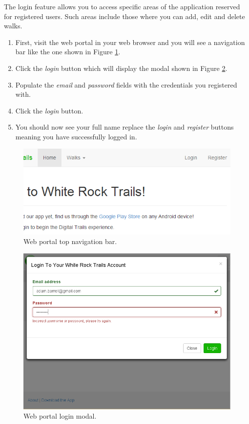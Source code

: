 \documentclass[11pt,a4paper]{report}
\begin{document}
The login feature allows you to access specific areas of the application reserved for registered users. Such areas include those where you can add, edit and delete walks.

\begin{enumerate}
\item First, visit the web portal in your web browser and you will see a navigation bar like the one shown in Figure \ref{fig:login-guide}.
\item Click the \emph{login} button which will display the modal shown in Figure \ref{fig:login-modal}.
\item Populate the \emph{email} and \emph{password} fields with the credentials you registered with.
\item Click the \emph{login} button.
\item You should now see your full name replace the \emph{login} and \emph{register} buttons meaning you have successfully logged in.
\end{enumerate}

\begin{figure}[H]
\centering
\includegraphics[width=0.7\linewidth]{./img/webportal-guide/login}
\caption{Web portal top navigation bar.}
\label{fig:login-guide}
\end{figure}

\begin{figure}[H]
\centering
\includegraphics[width=0.6\linewidth]{./img/webportal/login}
\caption{Web portal login modal.}
\label{fig:login-modal}
\end{figure}
\end{document}
